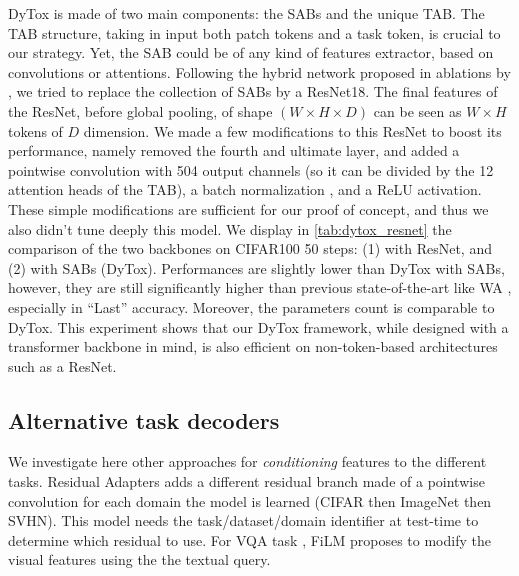 DyTox is made of two main components: the SABs and the unique TAB. The TAB structure, taking in
input both patch tokens and a task token, is crucial to our strategy. Yet, the SAB could be of any
kind of features extractor, based on convolutions or attentions. Following the hybrid network
proposed in ablations by \citet{dosovitskiy2020vit}, we tried to replace the collection of SABs by a
ResNet18. The final features of the ResNet, before global pooling, of shape $(W \times H \times D)$
can be seen as $W \times H$ tokens of $D$ dimension. We made a few modifications to this ResNet to
boost its performance, namely removed the fourth and ultimate layer, and added a pointwise
convolution with 504 output channels (so it can be divided by the 12 attention heads of the TAB), a
batch normalization \citep{ioffe2015batchnorm}, and a ReLU activation. These simple modifications
are sufficient for our proof of concept, and thus we also didn't tune deeply this model. We display
in \autoref{tab:dytox_resnet} the comparison of the two backbones on CIFAR100 50 steps: (1) with
ResNet, and (2) with SABs (DyTox). Performances are slightly lower than DyTox with SABs, however,
they are still significantly higher than previous state-of-the-art like WA
\citep{zhao2020weightalignement}, especially in ``Last'' accuracy. Moreover, the parameters count is
comparable to DyTox. This experiment shows that our DyTox framework, while designed with a
transformer backbone in mind, is also efficient on non-token-based architectures such as a ResNet.



\subsection{Alternative task decoders}

We investigate here other approaches for \textit{conditioning} features to the different tasks.
Residual Adapters \citep{rebuffi2017residualadapters} adds a different residual branch made of a
pointwise convolution for each domain the model is learned (\eg CIFAR then ImageNet then SVHN). This
model needs the task/dataset/domain identifier at test-time to determine which residual to use. For
VQA task \citep{antol2015vqa}, FiLM \citep{perez2018film} proposes to modify the visual features
using the the textual query.

